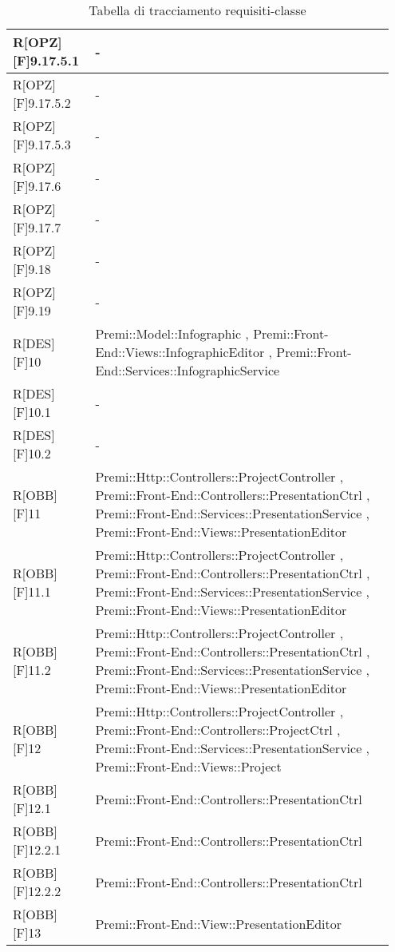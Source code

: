 \newpage
\begin{table}[h]
	\begin{center}
		\begin{tabular}{|p{0.2\linewidth}|p{0.75\linewidth}|}
			\toprule
			R[OPZ][F]9.17.5.1 & -\\
		\midrule
			R[OPZ][F]9.17.5.2 & -\\
		\midrule
			R[OPZ][F]9.17.5.3 & -\\
		\midrule
			R[OPZ][F]9.17.6 & -\\
		\midrule
			R[OPZ][F]9.17.7 & -\\
		\midrule
			R[OPZ][F]9.18 & -\\
		\midrule
			R[OPZ][F]9.19 & -\\
		\midrule
			R[DES][F]10 & Premi::Model::Infographic , Premi::Front-End::Views::InfographicEditor , Premi::Front-End::Services::InfographicService\\
		\midrule
			R[DES][F]10.1 & -\\
		\midrule
			R[DES][F]10.2 & -\\
		\midrule
			R[OBB][F]11 & Premi::Http::Controllers::ProjectController , Premi::Front-End::Controllers::PresentationCtrl , Premi::Front-End::Services::PresentationService , Premi::Front-End::Views::PresentationEditor\\
		\midrule
			R[OBB][F]11.1 & Premi::Http::Controllers::ProjectController , Premi::Front-End::Controllers::PresentationCtrl , Premi::Front-End::Services::PresentationService , Premi::Front-End::Views::PresentationEditor\\
		\midrule
			R[OBB][F]11.2 & Premi::Http::Controllers::ProjectController , Premi::Front-End::Controllers::PresentationCtrl , Premi::Front-End::Services::PresentationService , Premi::Front-End::Views::PresentationEditor\\
		\midrule
			R[OBB][F]12 & Premi::Http::Controllers::ProjectController , Premi::Front-End::Controllers::ProjectCtrl , Premi::Front-End::Services::PresentationService , Premi::Front-End::Views::Project\\
		\midrule
			R[OBB][F]12.1 & Premi::Front-End::Controllers::PresentationCtrl\\
		\midrule
			R[OBB][F]12.2.1 & Premi::Front-End::Controllers::PresentationCtrl\\
		\midrule
			R[OBB][F]12.2.2 & Premi::Front-End::Controllers::PresentationCtrl\\
		\midrule
			R[OBB][F]13 & Premi::Front-End::View::PresentationEditor\\
			\bottomrule
		\end{tabular}
	\end{center}
	\caption{Tabella di tracciamento requisiti-classe}
\end{table}